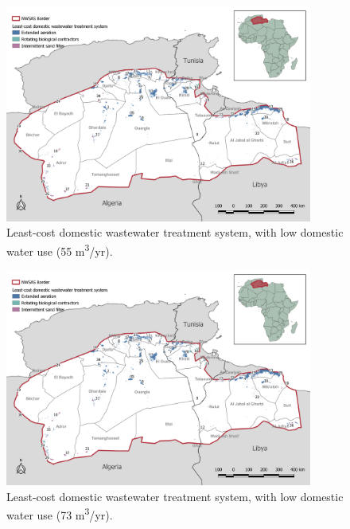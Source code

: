 \documentclass[12pt]{iopart}
\begin{document}
\begin{figure}[!h]
	\centering
	\includegraphics[width=0.9\textwidth, cfbox=black 1pt 0pt]{NWSAS_least_mid_demand}
	\caption{Least-cost domestic wastewater treatment system, with low domestic water use (55 m\textsuperscript{3}/yr).}
	\label{fig:leastMidDemand}
\end{figure}

\begin{figure}[!h]
	\centering
	\includegraphics[width=0.9\textwidth, cfbox=black 1pt 0pt]{NWSAS_least_high_demand}
	\caption{Least-cost domestic wastewater treatment system, with low domestic water use (73 m\textsuperscript{3}/yr).}
	\label{fig:leastHighDemand}
\end{figure}


\clearpage
\end{document}
